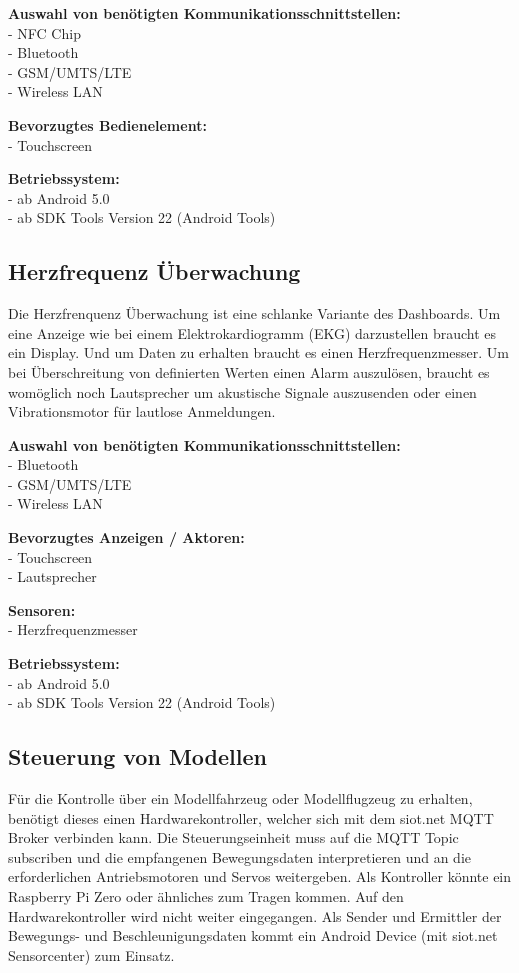\textbf{Auswahl von benötigten Kommunikationsschnittstellen:}\\
- NFC Chip\\
- Bluetooth\\
- GSM/UMTS/LTE\\
- Wireless LAN

\textbf{Bevorzugtes Bedienelement:}\\
- Touchscreen

\textbf{Betriebssystem:}\\
- ab Android 5.0\\
- ab SDK Tools Version 22 (Android Tools)

\subsection{Herzfrequenz Überwachung}
Die Herzfrenquenz Überwachung ist eine schlanke Variante des Dashboards. Um eine Anzeige wie bei einem Elektrokardiogramm (EKG) darzustellen braucht es ein Display. Und um Daten zu erhalten braucht es einen Herzfrequenzmesser. Um bei Überschreitung von definierten Werten einen Alarm auszulösen, braucht es womöglich noch Lautsprecher um akustische Signale auszusenden oder einen Vibrationsmotor für lautlose Anmeldungen.

\textbf{Auswahl von benötigten Kommunikationsschnittstellen:}\\
- Bluetooth\\
- GSM/UMTS/LTE\\
- Wireless LAN

\textbf{Bevorzugtes Anzeigen / Aktoren:}\\
- Touchscreen\\
- Lautsprecher

\textbf{Sensoren:}\\
- Herzfrequenzmesser

\textbf{Betriebssystem:}\\
- ab Android 5.0\\
- ab SDK Tools Version 22 (Android Tools)

\subsection{Steuerung von Modellen}
Für die Kontrolle über ein Modellfahrzeug oder Modellflugzeug zu erhalten, benötigt dieses einen Hardwarekontroller, welcher sich mit dem siot.net MQTT Broker verbinden kann. Die Steuerungseinheit muss auf die MQTT Topic subscriben und die empfangenen Bewegungsdaten interpretieren und an die erforderlichen Antriebsmotoren und Servos weitergeben. Als Kontroller könnte ein Raspberry Pi Zero oder ähnliches zum Tragen kommen. Auf den Hardwarekontroller wird nicht weiter eingegangen. Als Sender und Ermittler der Bewegungs- und Beschleunigungsdaten kommt ein Android Device (mit siot.net Sensorcenter) zum Einsatz.

